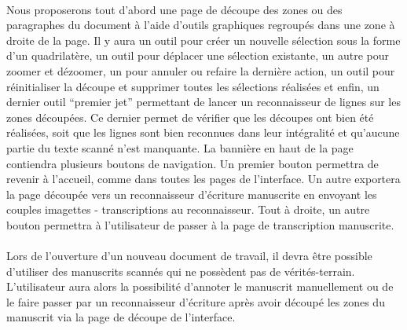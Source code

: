 \paragraph{}
Nous proposerons tout d’abord une page de découpe des zones ou des paragraphes du document à l’aide d’outils graphiques regroupés dans une zone à droite de la page. Il y aura un outil pour créer un nouvelle sélection sous la forme d’un quadrilatère, un outil pour déplacer une sélection existante, un autre pour zoomer et dézoomer, un pour annuler ou refaire la dernière action, un outil pour réinitialiser la découpe et supprimer toutes les sélections réalisées et enfin, un dernier outil “premier jet” permettant de lancer un reconnaisseur de lignes sur les zones découpées. Ce dernier permet de vérifier que les découpes ont bien été réalisées, soit que les lignes sont bien reconnues dans leur intégralité et qu'aucune partie du texte scanné n’est manquante. 
La bannière en haut de la page contiendra plusieurs boutons de navigation. Un premier bouton permettra de revenir à l’accueil, comme dans toutes les pages de l’interface. Un autre exportera la page découpée vers un reconnaisseur d’écriture manuscrite en envoyant les couples imagettes - transcriptions au reconnaisseur. Tout à droite, un autre bouton permettra à l’utilisateur de passer à la page de transcription manuscrite.


\paragraph{}
Lors de l’ouverture d’un nouveau document de travail, il devra être possible d’utiliser des manuscrits scannés qui ne possèdent pas de vérités-terrain. L’utilisateur aura alors la possibilité d’annoter le manuscrit manuellement ou de le faire passer par un reconnaisseur d’écriture après avoir découpé les zones du manuscrit via la page de découpe de l’interface.

